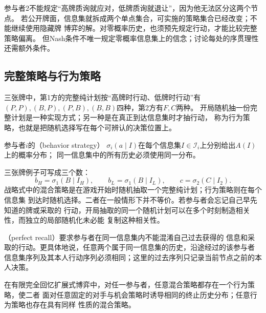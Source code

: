 参与者2不能规定“高牌质询就应对，低牌质询就退让”，因为他无法区分这两个节点。
若公开牌面，信息集就拆成两个单点集合，可实施的策略集合已经改变；不能继续使用隐藏牌
博弈的解。对零概率历史，也须预先规定行动，才能比较完整策略偏离。
但Nash条件不唯一规定零概率信息集上的信念；讨论每处的序贯理性还需额外条件。

\subsection{完整策略与行为策略}
\label{sec:game-complete-behavior}

三张牌中，第1方的完整纯计划按“高牌时行动、低牌时行动”有
\((P,P),(B,P),(P,B),(B,B)\)四种，第2方有\(F,C\)两种。
开局随机抽一份完整计划是一种实现方式；另一种是在真正到达信息集时才抽行动，
称为行为策略，也就是把随机选择写在每个可辨认的决策位置上。
\begin{definition}[行为策略]
\label{def:game-behavior-strategy}
参与者\(i\)的（behavior strategy）
\(\sigma_i(a\mid I)\)在每个信息集\(I\in\mathcal{I}_i\)上分别给出$A(I)$上的概率分布；
同一信息集中的所有历史必须使用同一分布。
\end{definition}
三张牌例子可写成三个数：
\[
  b_H=\sigma_1(B\mid I_H),\qquad
  b_L=\sigma_1(B\mid I_L),\qquad
  c=\sigma_2(C\mid I_2).
\]
战略式中的混合策略是在游戏开始时随机抽取一个完整纯计划；行为策略则在每个信息集
到达时随机选择。二者在一般情形下并不等价。若参与者会忘记自己早先知道的牌或采取的
行动，开局抽取的同一个随机计划可以在多个时刻制造相关性，而独立的局部随机化未必能
复制这种相关性。

\begin{definition}[完全回忆]
\label{def:game-perfect-recall}
（perfect recall）要求参与者在同一信息集内不能混淆自己过去获得的
信息和采取的行动。更具体地说，任意两个属于同一信息集的历史，沿途经过的该参与者
信息集序列及其本人行动序列必须相同；这里的过去序列只记录当前节点之前的本人决策。
\end{definition}

\begin{theorem}[Kuhn实现等价]
\label{thm:game-kuhn-equivalence}
在有限完全回忆扩展式博弈中，对任一参与者，任意混合策略都存在一个行为策略，使二者
面对任意固定的对手与机会策略时诱导相同的终止历史分布；任意行为策略也存在具有同样
性质的混合策略。
\end{theorem}

